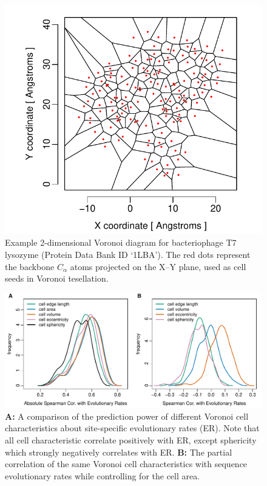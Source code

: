 \documentclass[11pt]{article}
\begin{document}
    \begin{figure}[tbh]
        \begin{center}
        \includegraphics[width=6.9in]{voronoi_diagram.pdf}
        \end{center}
        \caption{Example 2-dimensional Voronoi diagram for bacteriophage T7 lysozyme (Protein Data Bank ID `1LBA'). The red dots represent the backbone $C_\alpha$ atoms projected on the X--Y plane, used as cell seeds in Voronoi tesellation.}
        \label{fig:voronoi}
    \end{figure}

    \begin{figure}[tbh]
        \begin{center}
        \includegraphics[width=7in]{best_voronoi_predictors_of_ER_screen.pdf}
        \end{center}
        \caption{{\bf A:} A comparison of the prediction power of different Voronoi cell characteristics about site-specific evolutionary rates (ER). Note that all cell characteristic correlate positively with ER, except sphericity which strongly negatively correlates with ER. {\bf B:} The partial correlation of the same Voronoi cell characteristics with sequence evolutionary rates while controlling for the cell area.}
        \label{fig:voronoi_ER}
    \end{figure}
\end{document}
